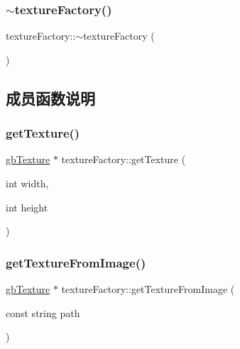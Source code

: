 \mbox{\label{classtexture_factory_a01827b2a02d25ec80e72bffb142e4b5a}} 
\subsubsection{\texorpdfstring{$\sim$textureFactory()}{~textureFactory()}}
{\footnotesize\ttfamily texture\+Factory\+::$\sim$texture\+Factory (\begin{DoxyParamCaption}{ }\end{DoxyParamCaption})}



\subsection{成员函数说明}
\mbox{\label{classtexture_factory_a580ab219f0b06a37795bb64b1a070f1a}} 
\subsubsection{\texorpdfstring{getTexture()}{getTexture()}}
{\footnotesize\ttfamily \mbox{\hyperlink{classgb_texture}{gb\+Texture}} $\ast$ texture\+Factory\+::get\+Texture (\begin{DoxyParamCaption}\item[{int}]{width,  }\item[{int}]{height }\end{DoxyParamCaption})}

\mbox{\label{classtexture_factory_ab14e97fdc012fd7b6642c5792c8f379c}} 
\subsubsection{\texorpdfstring{getTextureFromImage()}{getTextureFromImage()}}
{\footnotesize\ttfamily \mbox{\hyperlink{classgb_texture}{gb\+Texture}} $\ast$ texture\+Factory\+::get\+Texture\+From\+Image (\begin{DoxyParamCaption}\item[{const string}]{path }\end{DoxyParamCaption})}


